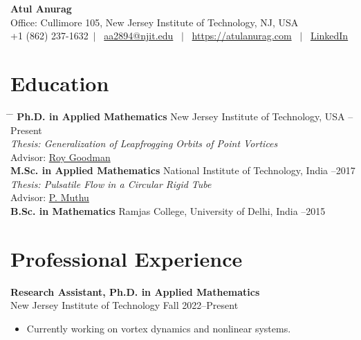 \documentclass[11pt,a4paper]{article}
\makeatletter
\def\name{Atul Anurag}
\def\address{Office: Cullimore 105, New Jersey Institute of Technology, NJ, USA}
\def\email{aa2894@njit.edu}
\def\phone{+1 (862) 237-1632}
\def\webpage{https://atulanurag.com}
\def\linkedin{https://www.linkedin.com/in/atul-anurag-290367166/}
\makeatother
\begin{document}
\begin{center}
    \textbf{\Huge \name}
    \vspace{5pt} \\
    \address \\
    \phone \ $|$ \ \href{mailto:\email}{\email} \ $|$ \ \href{\webpage}{\webpage} \ $|$ \ \href{\linkedin}{LinkedIn}
\end{center}

\vspace{15pt}

\section*{Education}
\begin{tabbing}
\hspace{2.5in} \= \hspace{3.0in} \= \kill
\textbf{Ph.D. in Applied Mathematics} \> New Jersey Institute of Technology, USA --Present \\
\textit{Thesis: Generalization of Leapfrogging Orbits of Point Vortices} \\
Advisor: \href{https://roygoodman.net}{Roy Goodman} \\
\textbf{M.Sc. in Applied Mathematics} \> National Institute of Technology, India --2017 \\
\textit{Thesis: Pulsatile Flow in a Circular Rigid Tube} \\
Advisor: \href{https://wsdc.nitw.ac.in/facultynew/facultyprofile/id/16401}{P. Muthu} \\
\textbf{B.Sc. in Mathematics} \> Ramjas College, University of Delhi, India --2015 \\
\end{tabbing}

\vspace{10pt}

\section*{Professional Experience}
\textbf{Research Assistant, Ph.D. in Applied Mathematics} \\
New Jersey Institute of Technology \hfill
Fall 2022--Present
\begin{itemize}[noitemsep]
    \item Currently working on vortex dynamics and nonlinear systems.
\end{itemize}
\end{document}

